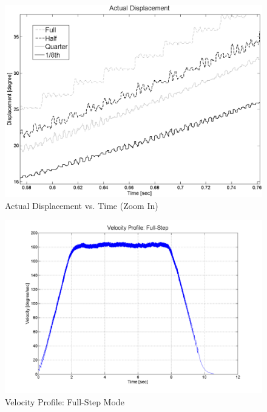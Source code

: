 \documentclass{article}
\theoremstyle{plain}
\theoremstyle{definition}
\theoremstyle{remark}
\begin{document}
\begin{figure}[h]
\includegraphics[width=1\textwidth]{Q4_ActualPosition_L.png}
\caption{Actual Displacement vs. Time (Zoom In)} \label{tex}
\label{fig:q4_10}
\end{figure}

\begin{figure}[h!]
\includegraphics[width=1\textwidth]{Q4_full_step.png}
\caption{Velocity Profile: Full-Step Mode} \label{tex}
\label{fig:q4_11}
\end{figure}
\end{document}
